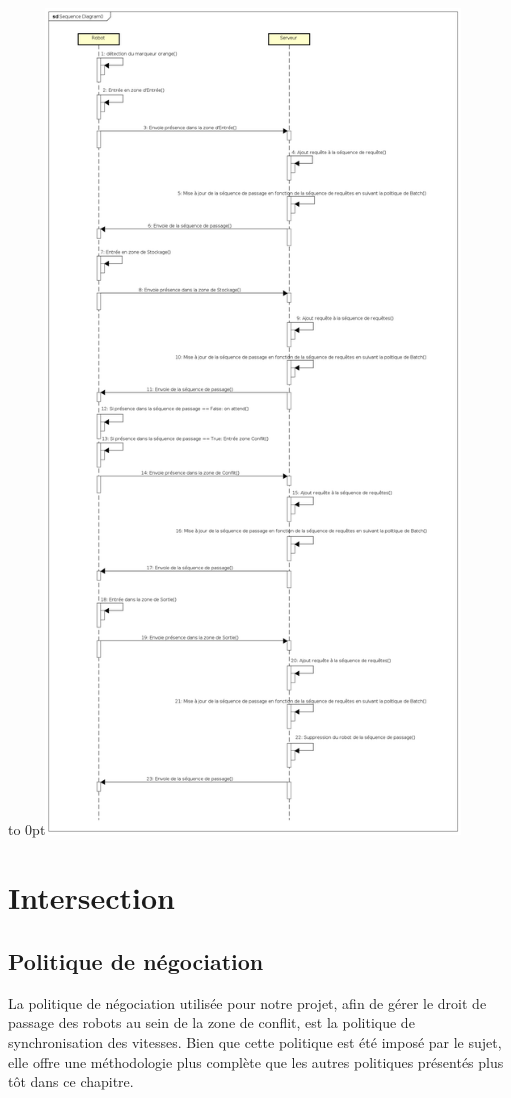 \documentclass[french,a4paper,12pt]{report}
\begin{document}
\hfill\hbox to 0pt{\hss\includegraphics[width=11cm]{diagSeq.png}\hss}\hfill\null\newline


\chapter{Intersection}

\section{Politique de négociation}
La politique de négociation utilisée pour notre projet, afin de gérer le droit de passage des robots au sein de la zone de conflit, est la politique de synchronisation des vitesses. Bien que cette politique est été imposé par le sujet, elle offre une méthodologie plus complète que les autres politiques présentés plus tôt dans ce chapitre.
\end{document}
